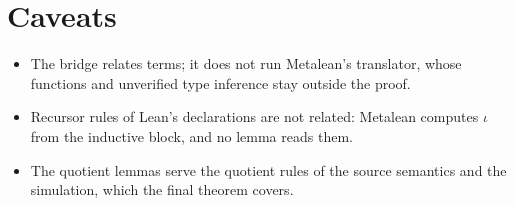 \section*{Caveats}
\begin{itemize}
\item {} The bridge relates terms; it does not run Metalean's translator, whose
   functions and unverified type inference stay outside the proof.
\item {} Recursor rules of Lean's declarations are not related: Metalean computes
  $\iota$ from the inductive block, and no lemma reads them.
\item {} The quotient lemmas serve the quotient rules of the source semantics and the
  simulation, which the final theorem covers.
\end{itemize}
